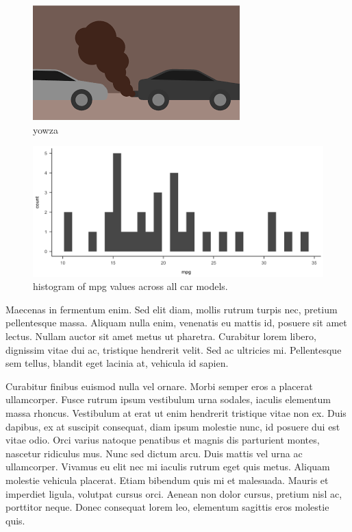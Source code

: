 \documentclass[
  english,
  man,floatsintext]{apa6}
\begin{document}
\begin{figure}

{\centering \includegraphics[width=3\linewidth]{smog} 

}

\caption{yowza}\label{fig:fig-BIGsmog}
\end{figure}



\begin{figure}

{\centering \includegraphics[width=0.75\linewidth]{figures/mpg-histogram} 

}

\caption{histogram of mpg values across all car models.}\label{fig:fig-mpghist}
\end{figure}

Maecenas in fermentum enim. Sed elit diam, mollis rutrum turpis nec, pretium pellentesque massa. Aliquam nulla enim, venenatis eu mattis id, posuere sit amet lectus. Nullam auctor sit amet metus ut pharetra. Curabitur lorem libero, dignissim vitae dui ac, tristique hendrerit velit. Sed ac ultricies mi. Pellentesque sem tellus, blandit eget lacinia at, vehicula id sapien.

Curabitur finibus euismod nulla vel ornare. Morbi semper eros a placerat ullamcorper. Fusce rutrum ipsum vestibulum urna sodales, iaculis elementum massa rhoncus. Vestibulum at erat ut enim hendrerit tristique vitae non ex. Duis dapibus, ex at suscipit consequat, diam ipsum molestie nunc, id posuere dui est vitae odio. Orci varius natoque penatibus et magnis dis parturient montes, nascetur ridiculus mus. Nunc sed dictum arcu. Duis mattis vel urna ac ullamcorper. Vivamus eu elit nec mi iaculis rutrum eget quis metus. Aliquam molestie vehicula placerat. Etiam bibendum quis mi et malesuada. Mauris et imperdiet ligula, volutpat cursus orci. Aenean non dolor cursus, pretium nisl ac, porttitor neque. Donec consequat lorem leo, elementum sagittis eros molestie quis.
\end{document}
